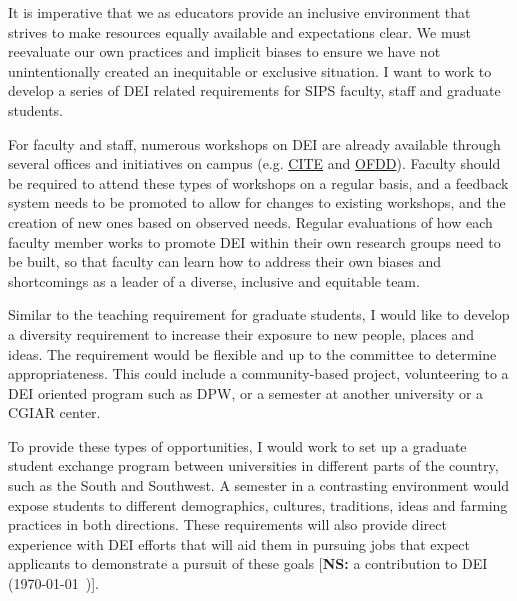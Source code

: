 \documentclass[11pt]{article}
\newcommand{\nicholas}[1]{{\color{nicholasCol} [\textbf{NS:} #1 (\today\ \currenttime)]}}
\begin{document}
It is imperative that we as educators provide an inclusive environment that strives to make resources equally available and expectations clear. We must reevaluate our own practices and implicit biases to ensure we have not unintentionally created an inequitable or exclusive situation. I want to work to develop a series of DEI related requirements for SIPS faculty, staff and graduate students. 

For faculty and staff, numerous workshops on DEI are already available through several offices and initiatives on campus (e.g. \href{https://hr.cornell.edu/professional-development/training/cite}{CITE} and \href{https://facultydevelopment.cornell.edu/}{OFDD}). Faculty should be required to attend these types of workshops on a regular basis, and a feedback system needs to be promoted to allow for changes to existing workshops, and the creation of new ones based on observed needs. Regular evaluations of how each faculty member works to promote DEI within their own research groups need to be built, so that faculty can learn how to address their own biases and shortcomings as a leader of a diverse, inclusive and equitable team.

Similar to the teaching requirement for graduate students, I would like to develop a diversity requirement to increase their exposure to new people, places and ideas. The requirement would be flexible and up to the committee to determine appropriateness. This could include a community-based project, volunteering to a DEI oriented program such as DPW, or a semester at another university or a CGIAR center. %

To provide these types of opportunities, I would work to set up a graduate student exchange program between universities in different parts of the country, such as the South and Southwest. A semester in a contrasting environment would expose students to different demographics, cultures, traditions, ideas and farming practices in both directions. These requirements will also provide direct experience with DEI efforts that will aid them in pursuing jobs that expect applicants to demonstrate a pursuit of these goals \nicholas{a contribution to DEI}. 

\end{document}
